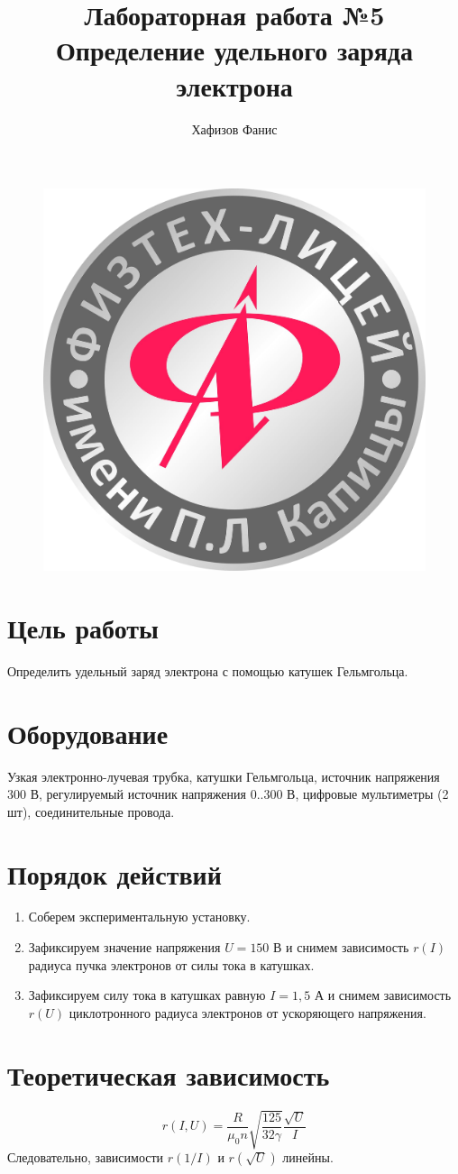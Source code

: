 \documentclass[12pt]{article}
\title{Лабораторная работа №5\\
	Определение удельного заряда электрона}
\author{Хафизов Фанис}
\begin{document}
	\begin{figure}
		\centering
		\includegraphics[width=0.3\linewidth]{logo}
	\end{figure}
	\maketitle
	\newpage
	\section{Цель работы}
	Определить удельный заряд электрона с помощью катушек Гельмгольца.
	\section{Оборудование}
	Узкая электронно-лучевая трубка, катушки Гельмгольца, источник напряжения 300 В, регулируемый источник напряжения 0..300 В, цифровые мультиметры (2 шт), соединительные провода.
	\section{Порядок действий}
	\begin{enumerate}
		\item Соберем экспериментальную установку.
		\item Зафиксируем значение напряжения $U=150$ В и снимем зависимость $r(I)$ радиуса пучка электронов от силы тока в катушках.
		\item Зафиксируем силу тока в катушках равную $I=1,5$ А и снимем зависимость $r(U)$ циклотронного радиуса электронов от ускоряющего напряжения.
	\end{enumerate}
	\section{Теоретическая зависимость}
	\[
	r(I,U)=\frac{R}{\mu_0n}\sqrt{\frac{125}{32\gamma}}\frac{\sqrt{U}}{I}
	\label{eq}
	\]
	Следовательно, зависимости $r(1/I)$ и $r(\sqrt{U})$ линейны.
\end{document}
